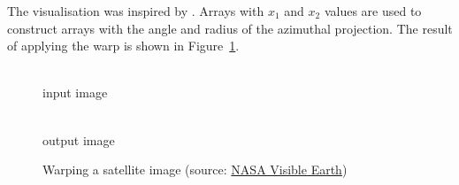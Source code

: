 \documentclass[12pt,a4paper,oneside,openright]{book}
\newcommand{\fig}[1]{Figure~\ref{fig:#1}}
\begin{document}
\begin{CJK}{UTF8}{}
\begin{figure}[htbp]
\end{figure}
The visualisation was inspired by \citet{RefWorks:467}. Arrays with $x_1$ and $x_2$ values are used to construct arrays with the angle and radius of the azimuthal projection. The result of applying the warp is shown in \fig{polar}.
\begin{figure}[htbp]
  \begin{center}
    \begin{minipage}[t]{.6\textwidth}
      \begin{center}
        \\
        input image
      \end{center}
    \end{minipage}
    \hspace{.5cm}
    \begin{minipage}[t]{.3\textwidth}
      \begin{center}
        \\
        output image
      \end{center}
    \end{minipage}
    \caption{Warping a satellite image (source: \href{http://visibleearth.nasa.gov/view_rec.php?id=7100}{NASA Visible Earth})\label{fig:polar}}
  \end{center}
\end{figure}


\end{CJK}
\end{document}
